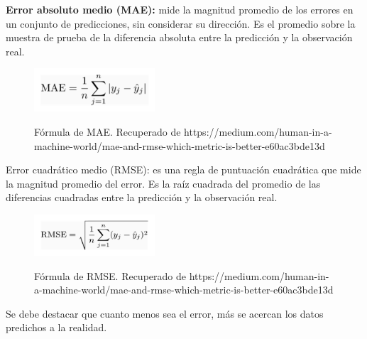 \textbf{Error absoluto medio (MAE):} mide la magnitud promedio de los errores en un conjunto de predicciones, sin considerar su dirección. Es el promedio sobre la muestra de prueba de la diferencia absoluta entre la predicción y la observación real.
\begin{figure}[h]
	\centering
	\caption{Fórmula de MAE. Recuperado de https://medium.com/human-in-a-machine-world/mae-and-rmse-which-metric-is-better-e60ac3bde13d}
	\includegraphics[width=0.4\textwidth]{recursos/mae}
	\label{fig:MAE}
\end{figure}
\FloatBarrier
Error cuadrático medio (RMSE): es una regla de puntuación cuadrática que mide la magnitud promedio del error. Es la raíz cuadrada del promedio de las diferencias cuadradas entre la predicción y la observación real.
\begin{figure}[h]
	\centering
	\caption{Fórmula de RMSE. Recuperado de https://medium.com/human-in-a-machine-world/mae-and-rmse-which-metric-is-better-e60ac3bde13d}
	\includegraphics[width=0.4\textwidth]{recursos/rmse}
	\label{fig:MAE}
\end{figure}
\FloatBarrier

Se debe destacar que cuanto menos sea el error, más se acercan los datos predichos a la realidad.


